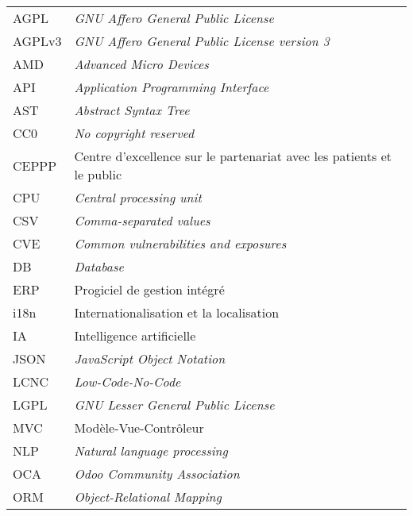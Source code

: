 \chapter*{\abbrevname}
\pagestyle{pagenumber}
%
\begin{acronym}
\end{acronym}
%
\begin{longtable}{lp{5in}}
AGPL      & \textit{GNU Affero General Public License}\\
AGPLv3    & \textit{GNU Affero General Public License version 3}\\
AMD       & \textit{Advanced Micro Devices}\\
API       & \textit{Application Programming Interface}\\
AST       & \textit{Abstract Syntax Tree}\\
CC0       & \textit{No copyright reserved}\\
CEPPP     & Centre d'excellence sur le partenariat avec les patients et le public\\
CPU       & \textit{Central processing unit}\\
CSV       & \textit{Comma-separated values}\\
CVE       & \textit{Common vulnerabilities and exposures}\\
DB        & \textit{Database}\\
ERP       & Progiciel de gestion intégré\\
i18n      & Internationalisation et la localisation\\
IA        & Intelligence artificielle\\
JSON      & \textit{JavaScript Object Notation}\\
LCNC      & \textit{Low-Code-No-Code}\\
LGPL      & \textit{GNU Lesser General Public License}\\
MVC       & Modèle-Vue-Contrôleur\\
NLP       & \textit{Natural language processing}\\
OCA       & \textit{Odoo Community Association}\\
ORM       & \textit{Object-Relational Mapping}\\

\end{longtable}
